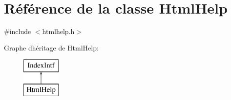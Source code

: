 \hypertarget{class_html_help}{}\section{Référence de la classe Html\+Help}
\label{class_html_help}


{\ttfamily \#include $<$htmlhelp.\+h$>$}

Graphe d\textquotesingle{}héritage de Html\+Help\+:\begin{figure}[H]
\begin{center}
\leavevmode
\includegraphics[height=2.000000cm]{class_html_help}
\end{center}
\end{figure}
